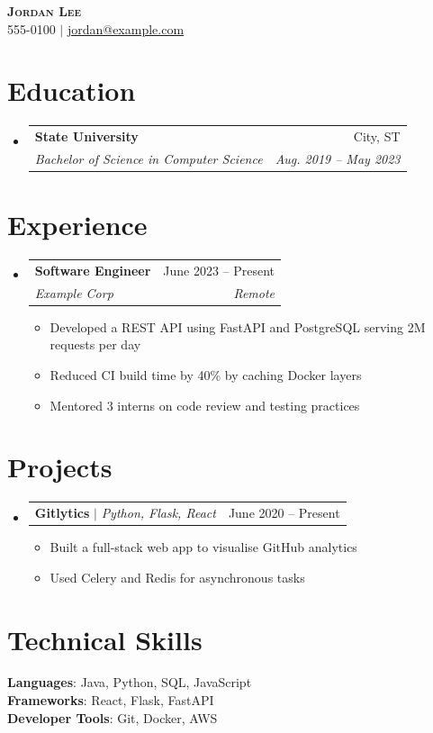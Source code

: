 \documentclass[letterpaper,11pt]{article}
\makeatletter
\newcommand{\resumeItem}[1]{
  \item\small{
    {#1 \vspace{-2pt}}
  }
}
\newcommand{\resumeSubheading}[4]{
  \vspace{-2pt}\item
    \begin{tabular*}{0.97\textwidth}[t]{l@{\extracolsep{\fill}}r}
      \textbf{#1} & #2 \\
      \textit{\small#3} & \textit{\small #4} \\
    \end{tabular*}\vspace{-7pt}
}
\newcommand{\resumeProjectHeading}[2]{
    \item
    \begin{tabular*}{0.97\textwidth}{l@{\extracolsep{\fill}}r}
      \small#1 & #2 \\
    \end{tabular*}\vspace{-7pt}
}
\newcommand{\resumeSubHeadingListStart}{\begin{itemize}[leftmargin=0.15in, label={}]}
\newcommand{\resumeSubHeadingListEnd}{\end{itemize}}
\newcommand{\resumeItemListStart}{\begin{itemize}}
\newcommand{\resumeItemListEnd}{\end{itemize}\vspace{-5pt}}
\makeatother
\begin{document}
\begin{center}
    \textbf{\Huge \scshape Jordan Lee} \\ \vspace{1pt}
    \small 555-0100 $|$ \href{mailto:jordan@example.com}{\underline{jordan@example.com}}
\end{center}

\section{Education}
  \resumeSubHeadingListStart
    \resumeSubheading
      {State University}{City, ST}
      {Bachelor of Science in Computer Science}{Aug. 2019 -- May 2023}
  \resumeSubHeadingListEnd

\section{Experience}
  \resumeSubHeadingListStart
    \resumeSubheading
      {Software Engineer}{June 2023 -- Present}
      {Example Corp}{Remote}
      \resumeItemListStart
        \resumeItem{Developed a REST API using FastAPI and PostgreSQL serving 2M requests per day}
        \resumeItem{Reduced CI build time by 40\% by caching Docker layers}
        \resumeItem{Mentored 3 interns on code review and testing practices}
      \resumeItemListEnd
  \resumeSubHeadingListEnd

\section{Projects}
    \resumeSubHeadingListStart
      \resumeProjectHeading
          {\textbf{Gitlytics} $|$ \emph{Python, Flask, React}}{June 2020 -- Present}
          \resumeItemListStart
            \resumeItem{Built a full-stack web app to visualise GitHub analytics}
            \resumeItem{Used Celery and Redis for asynchronous tasks}
          \resumeItemListEnd
    \resumeSubHeadingListEnd

\section{Technical Skills}
 \begin{itemize}[leftmargin=0.15in, label={}]
    \small{\item{
     \textbf{Languages}{: Java, Python, SQL, JavaScript} \\
     \textbf{Frameworks}{: React, Flask, FastAPI} \\
     \textbf{Developer Tools}{: Git, Docker, AWS}
    }}
 \end{itemize}
\end{document}
